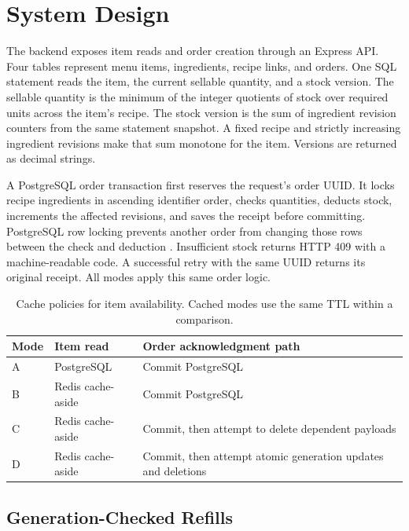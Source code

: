 \section{System Design}

The backend exposes item reads and order creation through an Express API. Four tables represent menu items, ingredients, recipe links, and orders. One SQL statement reads the item, the current sellable quantity, and a stock version. The sellable quantity is the minimum of the integer quotients of stock over required units across the item's recipe. The stock version is the sum of ingredient revision counters from the same statement snapshot. A fixed recipe and strictly increasing ingredient revisions make that sum monotone for the item. Versions are returned as decimal strings.

A PostgreSQL order transaction first reserves the request's order UUID. It locks recipe ingredients in ascending identifier order, checks quantities, deducts stock, increments the affected revisions, and saves the receipt before committing. PostgreSQL row locking prevents another order from changing those rows between the check and deduction \cite{postgreslocks}. Insufficient stock returns HTTP 409 with a machine-readable code. A successful retry with the same UUID returns its original receipt. All modes apply this same order logic.

\begin{table}[t]
\centering
\caption{Cache policies for item availability. Cached modes use the same TTL within a comparison.}
\label{tab:policies}
\begin{tabular}{@{}l p{.95in} p{1.87in}@{}}
\toprule
Mode & Item read & Order acknowledgment path \\
\midrule
A & PostgreSQL & Commit PostgreSQL \\
B & Redis cache-aside & Commit PostgreSQL \\
C & Redis cache-aside & Commit, then attempt to delete dependent payloads \\
D & Redis cache-aside & Commit, then attempt atomic generation updates and deletions \\
\bottomrule
\end{tabular}
\end{table}

\subsection{Generation-Checked Refills}

